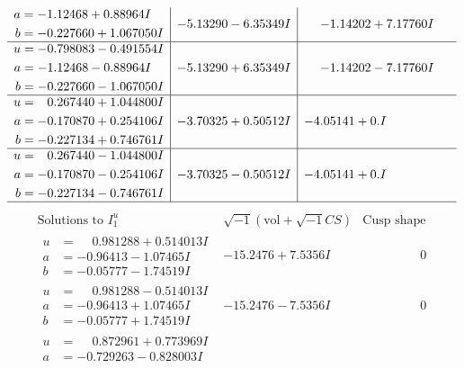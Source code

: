 \documentclass[1p]{elsarticle_modified}
\theoremstyle{definition}
\newcommand{\I}{\sqrt{-1}}
\begin{document}
$$\begin{array}{c|c|c}
\begin{aligned}
a &= -1.12468 + 0.88964 I \\
b &= -0.227660 + 1.067050 I\end{aligned}
 & -5.13290 - 6.35349 I & -1.14202 + 7.17760 I \\ \hline\begin{aligned}
u &= -0.798083 - 0.491554 I \\
a &= -1.12468 - 0.88964 I \\
b &= -0.227660 - 1.067050 I\end{aligned}
 & -5.13290 + 6.35349 I & -1.14202 - 7.17760 I \\ \hline\begin{aligned}
u &= \phantom{-}0.267440 + 1.044800 I \\
a &= -0.170870 + 0.254106 I \\
b &= -0.227134 + 0.746761 I\end{aligned}
 & -3.70325 + 0.50512 I & -4.05141 + 0. I\phantom{ +0.000000I} \\ \hline\begin{aligned}
u &= \phantom{-}0.267440 - 1.044800 I \\
a &= -0.170870 - 0.254106 I \\
b &= -0.227134 - 0.746761 I\end{aligned}
 & -3.70325 - 0.50512 I & -4.05141 + 0. I\phantom{ +0.000000I}\\
 \hline 
 \end{array}$$\newpage$$\begin{array}{c|c|c}  
\text{Solutions to }I^u_{1}& \I (\text{vol} + \sqrt{-1}CS) & \text{Cusp shape}\\
 \hline 
\begin{aligned}
u &= \phantom{-}0.981288 + 0.514013 I \\
a &= -0.96413 - 1.07465 I \\
b &= -0.05777 - 1.74519 I\end{aligned}
 & -15.2476 + 7.5356 I & \phantom{-0.000000 } 0 \\ \hline\begin{aligned}
u &= \phantom{-}0.981288 - 0.514013 I \\
a &= -0.96413 + 1.07465 I \\
b &= -0.05777 + 1.74519 I\end{aligned}
 & -15.2476 - 7.5356 I & \phantom{-0.000000 } 0 \\ \hline\begin{aligned}
u &= \phantom{-}0.872961 + 0.773969 I \\
a &= -0.729263 - 0.828003 I \\

\end{aligned}
\end{array}$$
\end{document}
